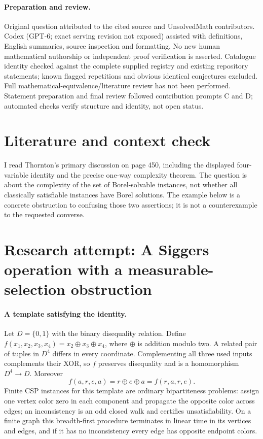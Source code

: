 \documentclass[11pt]{article}
\begin{document}
\paragraph{Preparation and review.}
Original question attributed to the cited source and UnsolvedMath contributors. Codex (GPT-6; exact serving revision not exposed) assisted with definitions, English summaries, source inspection and formatting. No new human mathematical authorship or independent proof verification is asserted. Catalogue identity checked against the complete supplied registry and existing repository statements; known flagged repetitions and obvious identical conjectures excluded. Full mathematical-equivalence/literature review has not been performed. Statement preparation and final review followed contribution prompts C and D; automated checks verify structure and identity, not open status.
\label{end:statement}

\section{Literature and context check}

I read Thornton's primary discussion on page 450, including the displayed
four-variable identity and the precise one-way complexity theorem. The question
is about the complexity of the set of Borel-solvable instances, not whether all
classically satisfiable instances have Borel solutions. The example below is a
concrete obstruction to confusing those two assertions; it is not a
counterexample to the requested converse.

\section{Research attempt: A Siggers operation with a measurable-selection obstruction}

\paragraph{A template satisfying the identity.}
Let $D=\{0,1\}$ with the binary disequality relation. Define
$f(x_1,x_2,x_3,x_4)=x_2\mathbin\oplus x_3\mathbin\oplus x_4$, where
$\oplus$ is addition modulo two.
A related pair of tuples in $D^4$ differs in every coordinate. Complementing
all three used inputs complements their XOR, so $f$ preserves disequality
and is a homomorphism $D^4\to D$.
Moreover
\[
 f(a,r,e,a)=r\oplus e\oplus a=f(r,a,r,e).
\]
Finite CSP instances for this template are ordinary bipartiteness problems:
assign one vertex color zero in each component and propagate the opposite
color across edges; an inconsistency is an odd closed walk and certifies
unsatisfiability. On a finite graph this breadth-first procedure terminates in
linear time in its vertices and edges, and if it has no inconsistency every
edge has opposite endpoint colors.
\end{document}
